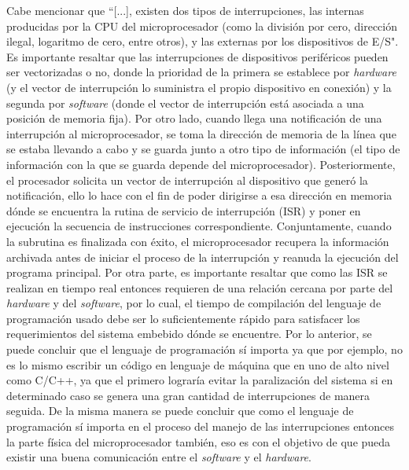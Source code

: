 \documentclass[11pt,letterpaper]{article}
\begin{document}
\newline
\newline
Cabe mencionar que ``[...], existen dos tipos de interrupciones, las internas producidas por la CPU del microprocesador (como la división por cero, dirección ilegal, logaritmo de cero, entre otros), y las externas por los dispositivos de E/S"\cite{c10}. Es importante resaltar que las interrupciones de dispositivos periféricos pueden ser vectorizadas o no, donde la prioridad de la primera se establece por \textit{hardware} (y el vector de interrupción lo suministra el propio dispositivo en conexión) y la segunda por \textit{software} (donde el vector de interrupción está asociada a una posición de memoria fija).
\newline
\newline
Por otro lado, cuando llega una notificación de una interrupción al microprocesador, se toma la dirección de memoria de la línea que se estaba llevando a cabo y se guarda junto a otro tipo de información (el tipo de información con la que se guarda depende del microprocesador). Posteriormente, el procesador solicita un vector de interrupción al dispositivo que generó la notificación, ello lo hace con el fin de poder dirigirse a esa dirección en memoria dónde se encuentra la rutina de servicio de interrupción (ISR) y poner en ejecución la secuencia de instrucciones correspondiente. Conjuntamente, cuando la subrutina es finalizada con éxito, el microprocesador recupera la información archivada antes de iniciar el proceso de la interrupción y reanuda la ejecución del programa principal.
\newline
\newline
Por otra parte, es importante resaltar que como las ISR se realizan en tiempo real entonces requieren de una relación cercana por parte del \textit{hardware} y del \textit{software}, por lo cual, el tiempo de compilación del lenguaje de programación usado debe ser lo suficientemente rápido para satisfacer los requerimientos del sistema embebido dónde se encuentre. Por lo anterior, se puede concluir que el lenguaje de programación sí importa ya que por ejemplo, no es lo mismo escribir un código en lenguaje de máquina que en uno de alto nivel como C/C++, ya que el primero lograría evitar la paralización del sistema si en determinado caso se genera una gran cantidad de interrupciones de manera seguida. De la misma manera se puede concluir que como el lenguaje de programación sí importa en el proceso del manejo de las interrupciones entonces la parte física del microprocesador también, eso es con el objetivo de que pueda existir una buena comunicación entre el \textit{software} y el \textit{hardware}.
\end{document}
